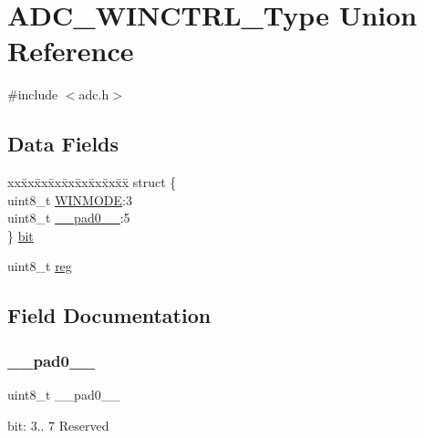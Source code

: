 \hypertarget{union_a_d_c___w_i_n_c_t_r_l___type}{}\section{A\+D\+C\+\_\+\+W\+I\+N\+C\+T\+R\+L\+\_\+\+Type Union Reference}
\label{union_a_d_c___w_i_n_c_t_r_l___type}


{\ttfamily \#include $<$adc.\+h$>$}

\subsection*{Data Fields}
\begin{DoxyCompactItemize}
\item 
\begin{tabbing}
xx\=xx\=xx\=xx\=xx\=xx\=xx\=xx\=xx\=\kill
struct \{\\
\>uint8\_t \mbox{\hyperlink{union_a_d_c___w_i_n_c_t_r_l___type_a286eda61ded31ed71d6222cc91dfb304}{WINMODE}}:3\\
\>uint8\_t \mbox{\hyperlink{union_a_d_c___w_i_n_c_t_r_l___type_a8b4eebe79ded0459acec2f4950102ba3}{\_\_pad0\_\_}}:5\\
\} \mbox{\hyperlink{union_a_d_c___w_i_n_c_t_r_l___type_a87c4720385e8213771f313efc4d65f17}{bit}}\\

\end{tabbing}\item 
uint8\+\_\+t \mbox{\hyperlink{union_a_d_c___w_i_n_c_t_r_l___type_a9428adc9af4653a2050e2536b55dec8d}{reg}}
\end{DoxyCompactItemize}


\subsection{Field Documentation}
\mbox{\label{union_a_d_c___w_i_n_c_t_r_l___type_a8b4eebe79ded0459acec2f4950102ba3}} 
\subsubsection{\texorpdfstring{\_\_pad0\_\_}{\_\_pad0\_\_}}
{\footnotesize\ttfamily uint8\+\_\+t \+\_\+\+\_\+pad0\+\_\+\+\_\+}

bit\+: 3.. 7 Reserved \mbox{\label{union_a_d_c___w_i_n_c_t_r_l___type_a87c4720385e8213771f313efc4d65f17}} 
